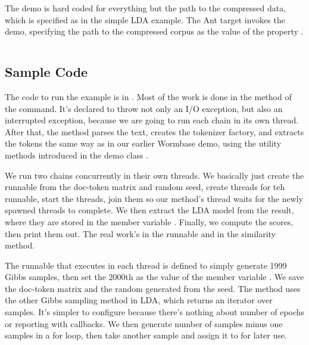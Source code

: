 The demo is hard coded for everything but the path to the compressed
data, which is specified as in the simple LDA example.  The Ant target
 invokes the demo, specifying the path to the
compressed corpus as the value of the property .
%
\begin{verbatim}

\end{verbatim}


\subsection{Sample Code}

The code to run the example is in .  Most of the
work is done in the  method of the command.  It's declared
to throw not only an I/O exception, but also an interrupted exception,
because we are going to run each chain in its own thread.  
%
%
After that, the method parses the text, creates the tokenizer factory,
and extracts the tokens the same way as in our earlier Wormbase demo,
using the utility methods introduced in the demo class .

We run two chains concurrently in their own threads.  We basically
just create the runnable from the doc-token matrix and random
seed, create threads for teh runnable, start the threads, join
them so our  method's thread waits for the newly spawned
threads to complete.  We then extract the LDA model from the result,
where they are stored in the member variable .  Finally,
we compute the scores, then print them out.
%
%
The real work's in the runnable and in the similarity method.

The runnable that executes in each thread is defined to simply
generate 1999 Gibbs samples, then set the 2000th as the value of
the member variable .
%
%
We save the doc-token matrix and the random generated from the seed.
The  method uses the other Gibbs sampling method in LDA,
which returns an iterator over samples.  It's simpler to configure
because there's nothing about number of epochs or reporting with callbacks.
We then generate number of samples minus one samples in a for loop,
then take another sample and assign it to  for later use.

